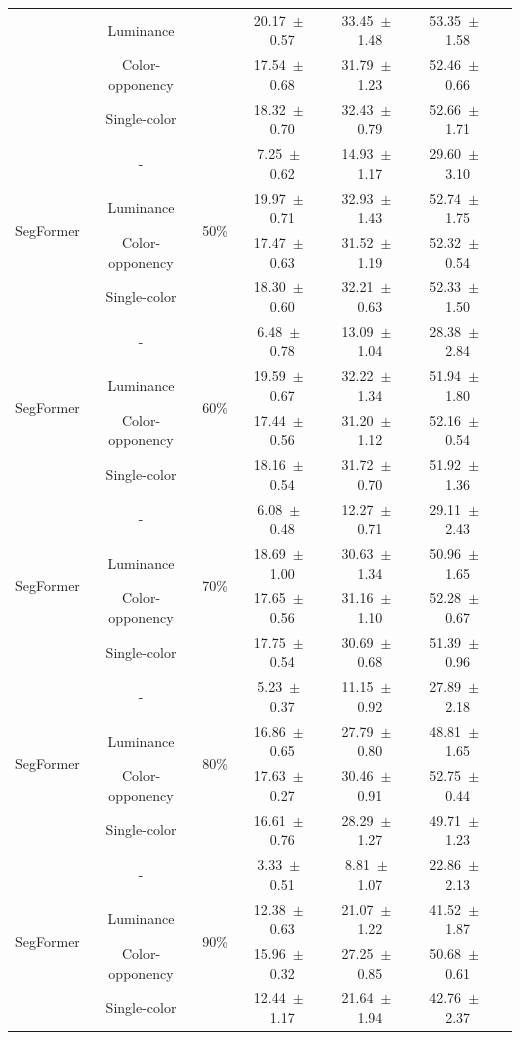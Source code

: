 \begin{table}[h]
\begin{tabular}{@{}lccc ccc@{}}
& Luminance & & 20.17~$\pm$~0.57 & 33.45~$\pm$~1.48 & 53.35~$\pm$~1.58 \\
& Color-opponency & & 17.54~$\pm$~0.68 & 31.79~$\pm$~1.23 & 52.46~$\pm$~0.66 \\
& Single-color & & 18.32~$\pm$~0.70 & 32.43~$\pm$~0.79 & 52.66~$\pm$~1.71 \\
\midrule
\multirow{4}{*}{SegFormer} & - & \multirow{4}{*}{50\%} & 7.25~$\pm$~0.62 & 14.93~$\pm$~1.17 & 29.60~$\pm$~3.10 \\
& Luminance & & 19.97~$\pm$~0.71 & 32.93~$\pm$~1.43 & 52.74~$\pm$~1.75 \\
& Color-opponency & & 17.47~$\pm$~0.63 & 31.52~$\pm$~1.19 & 52.32~$\pm$~0.54 \\
& Single-color & & 18.30~$\pm$~0.60 & 32.21~$\pm$~0.63 & 52.33~$\pm$~1.50 \\
\midrule
\multirow{4}{*}{SegFormer} & - & \multirow{4}{*}{60\%} & 6.48~$\pm$~0.78 & 13.09~$\pm$~1.04 & 28.38~$\pm$~2.84 \\
& Luminance & & 19.59~$\pm$~0.67 & 32.22~$\pm$~1.34 & 51.94~$\pm$~1.80 \\
& Color-opponency & & 17.44~$\pm$~0.56 & 31.20~$\pm$~1.12 & 52.16~$\pm$~0.54 \\
& Single-color & & 18.16~$\pm$~0.54 & 31.72~$\pm$~0.70 & 51.92~$\pm$~1.36 \\
\midrule
\multirow{4}{*}{SegFormer} & - & \multirow{4}{*}{70\%} & 6.08~$\pm$~0.48 & 12.27~$\pm$~0.71 & 29.11~$\pm$~2.43 \\
& Luminance & & 18.69~$\pm$~1.00 & 30.63~$\pm$~1.34 & 50.96~$\pm$~1.65 \\
& Color-opponency & & 17.65~$\pm$~0.56 & 31.16~$\pm$~1.10 & 52.28~$\pm$~0.67 \\
& Single-color & & 17.75~$\pm$~0.54 & 30.69~$\pm$~0.68 & 51.39~$\pm$~0.96 \\
\midrule
\multirow{4}{*}{SegFormer} & - & \multirow{4}{*}{80\%} & 5.23~$\pm$~0.37 & 11.15~$\pm$~0.92 & 27.89~$\pm$~2.18 \\
& Luminance & & 16.86~$\pm$~0.65 & 27.79~$\pm$~0.80 & 48.81~$\pm$~1.65 \\
& Color-opponency & & 17.63~$\pm$~0.27 & 30.46~$\pm$~0.91 & 52.75~$\pm$~0.44 \\
& Single-color & & 16.61~$\pm$~0.76 & 28.29~$\pm$~1.27 & 49.71~$\pm$~1.23 \\
\midrule
\multirow{4}{*}{SegFormer} & - & \multirow{4}{*}{90\%} & 3.33~$\pm$~0.51 & 8.81~$\pm$~1.07 & 22.86~$\pm$~2.13 \\
& Luminance & & 12.38~$\pm$~0.63 & 21.07~$\pm$~1.22 & 41.52~$\pm$~1.87 \\
& Color-opponency & & 15.96~$\pm$~0.32 & 27.25~$\pm$~0.85 & 50.68~$\pm$~0.61 \\
& Single-color & & 12.44~$\pm$~1.17 & 21.64~$\pm$~1.94 & 42.76~$\pm$~2.37 \\
\midrule
\bottomrule
\end{tabular}
\label{tab:sparse_results_segformer_dark_zurich}
\end{table}